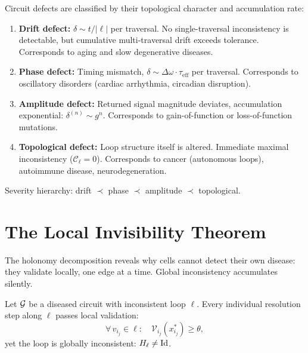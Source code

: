 \begin{definition}
\label{def:defect-types}
Circuit defects are classified by their topological character and
accumulation rate:
\begin{enumerate}[label=(\roman*), itemsep=2pt]
  \item \textbf{Drift defect:} $\delta \sim t/|\ell|$ per traversal.
        No single-traversal inconsistency is detectable, but cumulative
        multi-traversal drift exceeds tolerance.  Corresponds to aging and
        slow degenerative diseases.
  \item \textbf{Phase defect:} Timing mismatch,
        $\delta \sim \Delta\omega \cdot \tau_{\mathrm{eff}}$ per traversal.
        Corresponds to oscillatory disorders (cardiac arrhythmia, circadian
        disruption).
  \item \textbf{Amplitude defect:} Returned signal magnitude deviates,
        accumulation exponential: $\delta^{(n)} \sim g^n$.  Corresponds to
        gain-of-function or loss-of-function mutations.
  \item \textbf{Topological defect:} Loop structure itself is altered.
        Immediate maximal inconsistency ($\mathcal{C}_\ell = 0$).
        Corresponds to cancer (autonomous loops), autoimmune disease,
        neurodegeneration.
\end{enumerate}
Severity hierarchy: drift $\prec$ phase $\prec$ amplitude $\prec$ topological.
\end{definition}

\section{The Local Invisibility Theorem}
\label{sec:invisibility}

The holonomy decomposition reveals why cells cannot detect their own disease:
they validate locally, one edge at a time.  Global inconsistency accumulates
silently.

\begin{theorem}
\label{thm:invisibility}
Let $\mathcal{G}$ be a diseased circuit with inconsistent loop $\ell$.  Every
individual resolution step along $\ell$ passes local validation:
\begin{equation}
  \forall\, v_{i_j} \in \ell:
  \quad \mathcal{V}_{i_j}(x_{i_j}^{*}) \geq \theta,
  \label{eq:invisibility}
\end{equation}
yet the loop is globally inconsistent: $H_\ell \neq \mathrm{Id}$.
\end{theorem}

